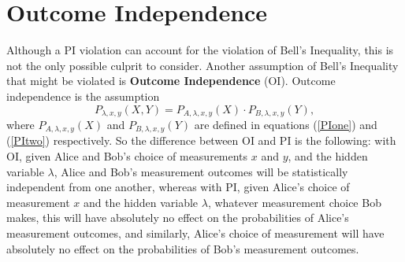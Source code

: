 \section{Outcome Independence\label{OISec}}

Although a PI violation can account for the violation of Bell's Inequality, this is not the only possible culprit to consider. Another assumption of Bell's Inequality that might be violated is \textbf{Outcome Independence} (OI). Outcome independence is the assumption
\begin{equation}\label{OI}
P_{\lambda,x,y}(X,Y)=P_{A,\lambda,x,y}(X)\cdot P_{B,\lambda,x,y}(Y),
\end{equation}
where $P_{A,\lambda,x,y}(X)$ and $P_{B,\lambda,x,y}(Y)$ are defined in equations (\ref{PIone}) and (\ref{PItwo}) respectively.
So the difference between OI and PI is the following: with OI, given Alice and Bob's choice of measurements $x$ and $y$, and the hidden variable $\lambda$, Alice and Bob's measurement outcomes will be statistically independent from one another, whereas with PI, given Alice's choice of measurement $x$ and the hidden variable $\lambda$, whatever measurement choice Bob makes, this will have absolutely no effect on the probabilities of Alice's measurement outcomes, and similarly, Alice's choice of measurement will have absolutely no effect on the probabilities of Bob's measurement outcomes. 

